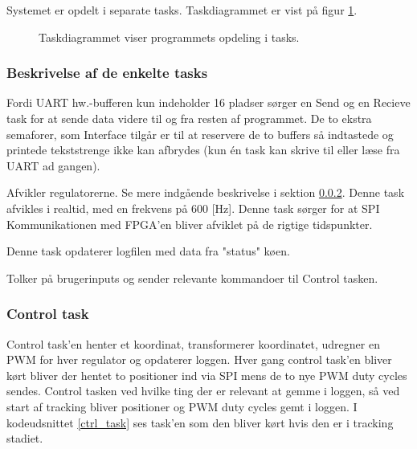 Systemet er opdelt i separate tasks.
Taskdiagrammet er vist på figur \ref{fig:task_diagram}. 

\begin{figure}[!h]
\centering
\begin{tikzpicture}[node distance = 3.2cm]
	
\end{tikzpicture}
\caption[Taskdiagram]{Taskdiagrammet viser programmets opdeling i tasks.}
\label{fig:task_diagram}
\end{figure}

\subsubsection{Beskrivelse af de enkelte tasks}
\begin{description}
\itemsep-3pt
	\item[UART send og -receive] Fordi UART hw.-bufferen kun indeholder 16 pladser \citep[Side. 430]{lm3s6965}
	sørger en Send og en Recieve task for at sende data videre til og fra resten af programmet.
	De to ekstra semaforer, som Interface tilgår er til at reservere de to buffers så indtastede og
	printede tekststrenge ikke kan afbrydes (kun én task kan skrive til eller læse fra UART ad gangen).
	\item[Control] Afvikler regulatorerne. Se mere indgående beskrivelse i sektion \ref{sec:control_task}.
	Denne task afvikles i realtid, med en frekvens på 600 [Hz]. 
	Denne task sørger for at SPI Kommunikationen med FPGA'en bliver afviklet på de rigtige tidspunkter.
	\item[Logger] Denne task opdaterer logfilen med data fra "status" køen.
	\item[Interface] Tolker på brugerinputs og sender relevante kommandoer til Control tasken.
\end{description}


\subsubsection{Control task}
\label{sec:control_task}
Control task'en henter et koordinat, transformerer koordinatet, udregner en PWM for hver regulator og opdaterer loggen.
Hver gang control task'en bliver kørt bliver der hentet to positioner ind via SPI mens de to nye PWM duty cycles sendes.
Control tasken ved hvilke ting der er relevant at gemme i loggen,
så ved start af tracking bliver positioner og PWM duty cycles gemt i loggen.
I kodeudsnittet \ref{ctrl_task} ses task'en som den bliver kørt hvis den er i tracking stadiet.

